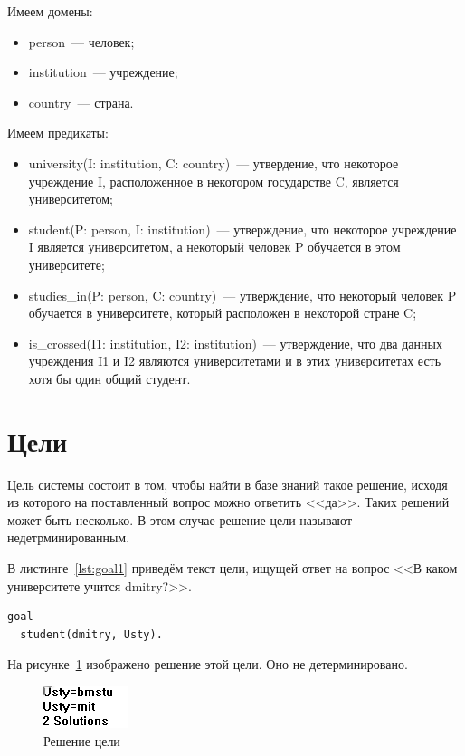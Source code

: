 Имеем домены:
\begin{itemize}
    \item person~--- человек;
    \item institution~--- учреждение;
    \item country~--- страна.
\end{itemize}

Имеем предикаты:
\begin{itemize}
    \item university(I: institution, C: country)~--- утвердение, что некоторое учреждение I, расположенное в некотором государстве C, является университетом;
    \item student(P: person, I: institution)~--- утверждение, что некоторое учреждение I является университетом, а некоторый человек P обучается в этом университете;
    \item studies\_in(P: person, C: country)~--- утверждение, что некоторый человек P обучается в университете, который расположен в некоторой стране C;
    \item is\_crossed(I1: institution, I2: institution)~--- утверждение, что два данных учреждения I1 и I2 являются университетами и в этих университетах есть хотя бы один общий студент.
\end{itemize}

\section{Цели}
Цель системы состоит в том, чтобы найти в базе знаний такое решение, исходя из которого на поставленный вопрос можно ответить <<да>>. Таких решений может быть несколько. В этом случае решение цели называют недетрминированным.

В листинге~\ref{lst:goal1} приведём текст цели, ищущей ответ на вопрос <<В каком университете учится dmitry?>>.
\begin{lstlisting}[caption={Цель \textnumero1},label=lst:goal1]
goal
  student(dmitry, Usty).
\end{lstlisting}
На рисунке~\ref{img:goal1} изображено решение этой цели. Оно не детерминировано.
\begin{figure}[H]
    \includegraphics[scale=0.75]{imgs/goal1.png}
    \caption{Решение цели }\label{img:goal1}
\end{figure}

